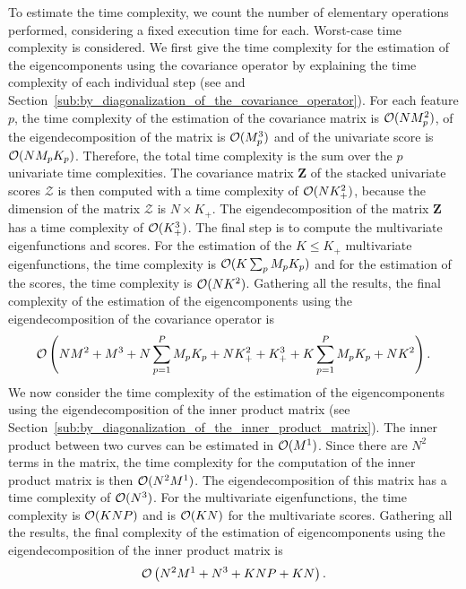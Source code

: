To estimate the time complexity, we count the number of elementary operations performed, considering a fixed execution time for each. Worst-case time complexity is considered. We first give the time complexity for the estimation of the eigencomponents using the covariance operator by explaining the time complexity of each individual step (see \cite{happMultivariateFunctionalPrincipal2018a} and Section~\ref{sub:by_diagonalization_of_the_covariance_operator}). For each feature $p$, the time complexity of the estimation of the covariance matrix is $\operatorname{\mathcal{O}}(NM_p^2)$, of the eigendecomposition of the matrix is $\operatorname{\mathcal{O}}(M_p^3)$ and of the univariate score is $\operatorname{\mathcal{O}}(NM_pK_p)$. Therefore, the total time complexity is the sum over the $p$ univariate time complexities. The covariance matrix $\mathbf{Z}$ of the stacked univariate scores $\mathcal{Z}$ is then computed with a time complexity of $\operatorname{\mathcal{O}}(NK_+^2)$, because the dimension of the matrix $\mathcal{Z}$ is $N \times K_+$. The eigendecomposition of the matrix $\mathbf{Z}$ has a time complexity of $\operatorname{\mathcal{O}}(K_+^3)$. The final step is to compute the multivariate eigenfunctions and scores. For the estimation of the $K \leq K_+$ multivariate eigenfunctions, the time complexity is $\operatorname{\mathcal{O}}(K\sum_{p} M_pK_p)$ and for the estimation of the scores, the time complexity is $\operatorname{\mathcal{O}}(NK^2)$. Gathering all the results, the final complexity of the estimation of the eigencomponents using the eigendecomposition of the covariance operator is
\begin{equation}\label{eq:time_compl_cov}
    \operatorname{\mathcal{O}}\left(NM^2 + M^3 + N\sum_{p = 1}^P M_pK_p + NK_+^2 + K_+^3 + K\sum_{p = 1}^P M_pK_p + NK^2\right).
\end{equation}
We now consider the time complexity of the estimation of the eigencomponents using the eigendecomposition of the inner product matrix (see Section~\ref{sub:by_diagonalization_of_the_inner_product_matrix}). The inner product between two curves can be estimated in $\operatorname{\mathcal{O}}(M^1)$. Since there are $N^2$ terms in the matrix, the time complexity for the computation of the inner product matrix is then $\operatorname{\mathcal{O}}(N^2M^1)$. The eigendecomposition of this matrix has a time complexity of $\operatorname{\mathcal{O}}(N^3)$. For the multivariate eigenfunctions, the time complexity is $\operatorname{\mathcal{O}}(KNP)$ and is $\operatorname{\mathcal{O}}(KN)$ for the multivariate scores. Gathering all the results, the final complexity of the estimation of eigencomponents using the eigendecomposition of the inner product matrix is
\begin{equation}\label{eq:time_compl_in_prod}
    \operatorname{\mathcal{O}}\left(N^2M^1 + N^3 + KNP + KN\right).
\end{equation}

